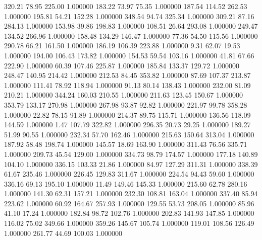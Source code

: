     320.21     78.95    225.00  1.000000
    183.22     73.97     75.35  1.000000
    187.54    114.52    262.53  1.000000
    195.81     54.21    152.28  1.000000
    348.54     94.74    325.34  1.000000
    309.21     87.16    284.13  1.000000
    153.98     39.86    198.83  1.000000
    108.51     26.64    293.08  1.000000
    249.47    134.52    266.96  1.000000
    158.48    134.29    146.47  1.000000
     77.36     54.50    115.56  1.000000
    290.78     66.21    161.50  1.000000
    186.19    106.39    223.88  1.000000
      9.31     62.07     19.53  1.000000
    194.00    106.43    173.82  1.000000
    154.53     59.54    103.16  1.000000
     41.81     67.66    222.90  1.000000
     60.39    107.46    225.87  1.000000
    185.84    133.37    129.72  1.000000
    248.47    140.95    214.42  1.000000
    212.53     84.45    353.82  1.000000
     87.69    107.37    213.87  1.000000
    111.41     78.92    118.94  1.000000
     91.13     80.14    138.43  1.000000
    232.00     81.09    210.21  1.000000
    344.24    160.03    210.55  1.000000
    211.63    123.45    150.67  1.000000
    353.79    133.17    270.98  1.000000
    267.98     93.87     92.82  1.000000
    221.97     99.78    358.28  1.000000
     22.82     78.15     91.89  1.000000
    214.37     89.75    115.71  1.000000
    136.56    118.09    144.59  1.000000
      1.47    107.79    322.82  1.000000
    296.35     20.73     29.25  1.000000
    189.27     51.99     90.55  1.000000
    232.34     57.70    162.46  1.000000
    215.63    150.64    313.04  1.000000
    187.92     58.48    198.74  1.000000
    145.57     18.69    163.90  1.000000
    311.43     76.56    335.71  1.000000
    209.73     45.54    129.00  1.000000
    334.73     98.79    174.57  1.000000
    177.18    140.89    104.10  1.000000
    336.15    103.33     21.86  1.000000
     84.97    127.29    311.31  1.000000
    338.39     61.67    235.46  1.000000
    226.45    129.83    311.67  1.000000
    224.54     94.43     59.60  1.000000
    336.16     69.13    195.10  1.000000
     11.49    149.46    145.33  1.000000
    215.60     62.78    280.16  1.000000
    141.30     62.31    157.21  1.000000
    232.30    108.81    163.04  1.000000
    337.40     85.94    223.62  1.000000
     60.92    164.67    257.93  1.000000
    129.55     53.73    208.05  1.000000
     85.96     41.10     17.24  1.000000
    182.84     98.72    102.76  1.000000
    202.83    141.93    147.85  1.000000
    116.02     75.02    349.66  1.000000
    359.26    145.67    105.74  1.000000
    119.01    108.56    126.49  1.000000
    261.77     44.69    100.03  1.000000
